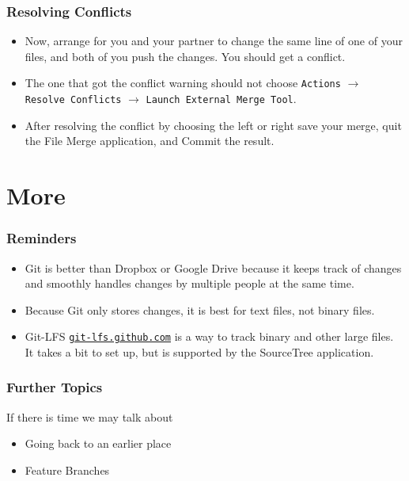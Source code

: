 \documentclass[12pt, compress,xcolor={usenames,dvipsnames}]{beamer} %
\begin{document}
\begin{frame}\frametitle{Resolving Conflicts}
	\vspace{-4ex}
	
	\begin{itemize}
		
		
		\item Now, arrange for you and your partner to change the same line of one of your files, and both of you push the changes.  You should get a \alert{conflict}.
		
		\item The one that got the conflict warning should not choose \texttt{Actions} $\rightarrow$ \texttt{Resolve Conflicts} $\rightarrow$ \texttt{Launch External Merge Tool}.
		
		\item After resolving the conflict by choosing the left or right \alert{save} your merge, \alert{quit} the File Merge application, and \alert{Commit} the result.
				
		
	\end{itemize}
	
\end{frame}

\section{More}

\begin{frame}\frametitle{Reminders}
	
	\begin{itemize}
		
		
		\item Git is better than Dropbox or Google Drive because it keeps track of changes and smoothly handles changes by multiple people at the same time.
		
		
		\item Because Git only stores changes, it is best for text files, not binary files.  
		
		\item Git-LFS \href{https://git-lfs.github.com}{\nolinkurl{git-lfs.github.com}}  is a way to track binary and other large files.  It takes a bit to set up, but is supported by the SourceTree application.  
		
		
		
	\end{itemize}
	
\end{frame}

\begin{frame}\frametitle{Further Topics}
	If there is time we may talk about
	
	\begin{itemize}
		
		
		\item Going back to an earlier place
		
		\item Feature Branches
		
		
		
	\end{itemize}
	
\end{frame}
\end{document}
